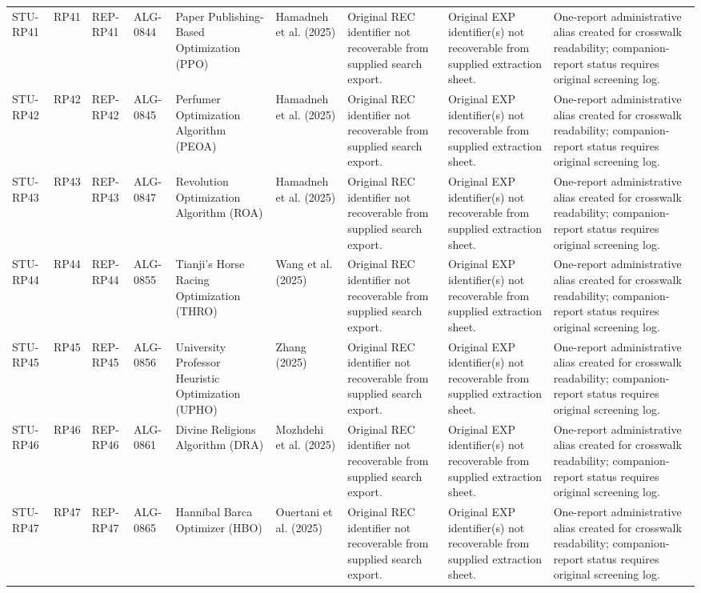 \documentclass[9pt]{article}
\begin{document}
\begin{landscape}
\begin{longtable}{P{1.5cm}P{1.0cm}P{1.8cm}P{1.8cm}P{5.2cm}P{4.3cm}P{3.4cm}P{3.3cm}P{3.0cm}}
STU-RP41 & RP41 & REP-RP41 & ALG-0844 & Paper Publishing-Based Optimization (PPO) & Hamadneh et al. (2025) & Original REC identifier not recoverable from supplied search export. & Original EXP identifier(s) not recoverable from supplied extraction sheet. & One-report administrative alias created for crosswalk readability; companion-report status requires original screening log. \\
STU-RP42 & RP42 & REP-RP42 & ALG-0845 & Perfumer Optimization Algorithm (PEOA) & Hamadneh et al. (2025) & Original REC identifier not recoverable from supplied search export. & Original EXP identifier(s) not recoverable from supplied extraction sheet. & One-report administrative alias created for crosswalk readability; companion-report status requires original screening log. \\
STU-RP43 & RP43 & REP-RP43 & ALG-0847 & Revolution Optimization Algorithm (ROA) & Hamadneh et al. (2025) & Original REC identifier not recoverable from supplied search export. & Original EXP identifier(s) not recoverable from supplied extraction sheet. & One-report administrative alias created for crosswalk readability; companion-report status requires original screening log. \\
STU-RP44 & RP44 & REP-RP44 & ALG-0855 & Tianji's Horse Racing Optimization (THRO) & Wang et al. (2025) & Original REC identifier not recoverable from supplied search export. & Original EXP identifier(s) not recoverable from supplied extraction sheet. & One-report administrative alias created for crosswalk readability; companion-report status requires original screening log. \\
STU-RP45 & RP45 & REP-RP45 & ALG-0856 & University Professor Heuristic Optimization (UPHO) & Zhang (2025) & Original REC identifier not recoverable from supplied search export. & Original EXP identifier(s) not recoverable from supplied extraction sheet. & One-report administrative alias created for crosswalk readability; companion-report status requires original screening log. \\
STU-RP46 & RP46 & REP-RP46 & ALG-0861 & Divine Religions Algorithm (DRA) & Mozhdehi et al. (2025) & Original REC identifier not recoverable from supplied search export. & Original EXP identifier(s) not recoverable from supplied extraction sheet. & One-report administrative alias created for crosswalk readability; companion-report status requires original screening log. \\
STU-RP47 & RP47 & REP-RP47 & ALG-0865 & Hannibal Barca Optimizer (HBO) & Ouertani et al. (2025) & Original REC identifier not recoverable from supplied search export. & Original EXP identifier(s) not recoverable from supplied extraction sheet. & One-report administrative alias created for crosswalk readability; companion-report status requires original screening log. \\

\end{longtable}
\end{landscape}
\end{document}

